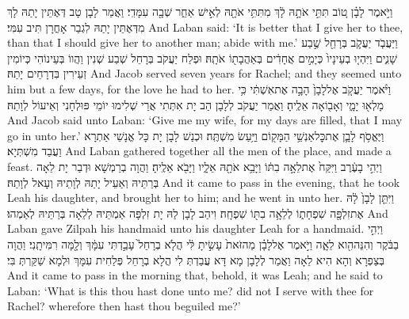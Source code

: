 {וַיֹּ֣אמֶר לָבָ֗ן ט֚וֹב תִּתִּ֣י אֹתָ֣הּ לָ֔ךְ מִתִּתִּ֥י אֹתָ֖הּ לְאִ֣ישׁ אַחֵ֑ר שְׁבָ֖ה עִמָּדִֽי׃}
{וַאֲמַר לָבָן טָב דְּאֶתֵּין יָתַהּ לָךְ מִדְּאֶתֵּין יָתַהּ לִגְבַר אָחֳרָן תִּיב עִמִּי׃}
{And Laban said: ‘It is better that I give her to thee, than that I should give her to another man; abide with me.’}{}
{וַיַּעֲבֹ֧ד יַעֲקֹ֛ב בְּרָחֵ֖ל שֶׁ֣בַע שָׁנִ֑ים וַיִּהְי֤וּ בְעֵינָיו֙ כְּיָמִ֣ים אֲחָדִ֔ים בְּאַהֲבָת֖וֹ אֹתָֽהּ׃}
{וּפְלַח יַעֲקֹב בְּרָחֵל שְׁבַע שְׁנִין וַהֲווֹ בְּעֵינוֹהִי כְּיוֹמִין זְעֵירִין בִּדְרָחֵים יָתַהּ׃}
{And Jacob served seven years for Rachel; and they seemed unto him but a few days, for the love he had to her.}{}
{וַיֹּ֨אמֶר יַעֲקֹ֤ב אֶל\maqqaf לָבָן֙ הָבָ֣ה אֶת\maqqaf אִשְׁתִּ֔י כִּ֥י מָלְא֖וּ יָמָ֑י וְאָב֖וֹאָה אֵלֶֽיהָ׃}
{וַאֲמַר יַעֲקֹב לְלָבָן הַב יָת אִתְּתִי אֲרֵי שְׁלִימוּ יוֹמֵי פּוּלְחָנִי וְאֵיעוֹל לְוָתַהּ׃}
{And Jacob said unto Laban: ‘Give me my wife, for my days are filled, that I may go in unto her.’}{}
{וַיֶּאֱסֹ֥ף לָבָ֛ן אֶת\maqqaf כׇּל\maqqaf אַנְשֵׁ֥י הַמָּק֖וֹם וַיַּ֥עַשׂ מִשְׁתֶּֽה׃}
{וּכְנַשׁ לָבָן יָת כָּל אֱנָשֵׁי אַתְרָא וַעֲבַד מִשְׁתְּיָא׃}
{And Laban gathered together all the men of the place, and made a feast.}{}
{וַיְהִ֣י בָעֶ֔רֶב וַיִּקַּח֙ אֶת\maqqaf לֵאָ֣ה בִתּ֔וֹ וַיָּבֵ֥א אֹתָ֖הּ אֵלָ֑יו וַיָּבֹ֖א אֵלֶֽיהָ׃}
{וַהֲוָה בְרַמְשָׁא וּדְבַר יָת לֵאָה בְּרַתֵּיהּ וְאַעֵיל יָתַהּ לְוָתֵיהּ וְעָאל לְוָתַהּ׃}
{And it came to pass in the evening, that he took Leah his daughter, and brought her to him; and he went in unto her.}{}
{וַיִּתֵּ֤ן לָבָן֙ לָ֔הּ אֶת\maqqaf זִלְפָּ֖ה שִׁפְחָת֑וֹ לְלֵאָ֥ה בִתּ֖וֹ שִׁפְחָֽה׃}
{וִיהַב לָבָן לַהּ יָת זִלְפָּה אַמְתֵּיהּ לְלֵאָה בְּרַתֵּיהּ לְאַמְהוּ׃}
{And Laban gave Zilpah his handmaid unto his daughter Leah for a handmaid.}{}
{וַיְהִ֣י בַבֹּ֔קֶר וְהִנֵּה\maqqaf הִ֖וא לֵאָ֑ה וַיֹּ֣אמֶר אֶל\maqqaf לָבָ֗ן מַה\maqqaf זֹּאת֙ עָשִׂ֣יתָ לִּ֔י הֲלֹ֤א בְרָחֵל֙ עָבַ֣דְתִּי עִמָּ֔ךְ וְלָ֖מָּה רִמִּיתָֽנִי׃}
{וַהֲוָה בְּצַפְרָא וְהָא הִיא לֵאָה וַאֲמַר לְלָבָן מָא דָּא עֲבַדְתְּ לִי הֲלָא בְרָחֵל פְּלַחִית עִמָּךְ וּלְמָא שַׁקַּרְתְּ בִּי׃}
{And it came to pass in the morning that, behold, it was Leah; and he said to Laban: ‘What is this thou hast done unto me? did not I serve with thee for Rachel? wherefore then hast thou beguiled me?’}{}
